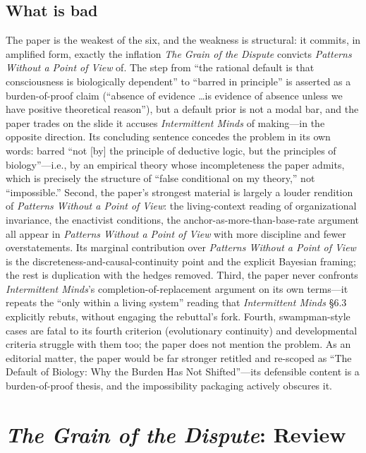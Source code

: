 \documentclass[11pt]{article}
\newcommand{\IM}{\emph{Intermittent Minds}}
\newcommand{\PP}{\emph{Patterns Without a Point of View}}
\newcommand{\GD}{\emph{The Grain of the Dispute}}
\begin{document}
\subsection{What is bad}
The paper is the weakest of the six, and the weakness is structural: it commits, in amplified form, exactly the inflation \GD{} convicts \PP{} of. The step from ``the rational default is that consciousness is biologically dependent'' to ``barred in principle'' is asserted as a burden-of-proof claim (``absence of evidence \dots is evidence of absence unless we have positive theoretical reason''), but a default prior is not a modal bar, and the paper trades on the slide it accuses \IM{} of making---in the opposite direction. Its concluding sentence concedes the problem in its own words: barred ``not [by] the principle of deductive logic, but the principles of biology''---i.e., by an empirical theory whose incompleteness the paper admits, which is precisely the structure of ``false conditional on my theory,'' not ``impossible.'' Second, the paper's strongest material is largely a louder rendition of \PP{}: the living-context reading of organizational invariance, the enactivist conditions, the anchor-as-more-than-base-rate argument all appear in \PP{} with more discipline and fewer overstatements. Its marginal contribution over \PP{} is the discreteness-and-causal-continuity point and the explicit Bayesian framing; the rest is duplication with the hedges removed. Third, the paper never confronts \IM{}'s completion-of-replacement argument on its own terms---it repeats the ``only within a living system'' reading that \IM{} \S 6.3 explicitly rebuts, without engaging the rebuttal's fork. Fourth, swampman-style cases are fatal to its fourth criterion (evolutionary continuity) and developmental criteria struggle with them too; the paper does not mention the problem. As an editorial matter, the paper would be far stronger retitled and re-scoped as ``The Default of Biology: Why the Burden Has Not Shifted''---its defensible content is a burden-of-proof thesis, and the impossibility packaging actively obscures it.

\section{\GD{}: Review}
\end{document}
